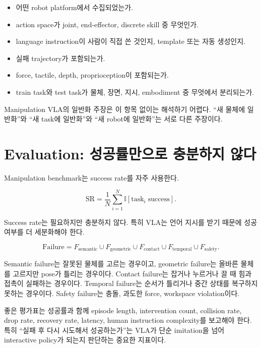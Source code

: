 \begin{itemize}
  \item 어떤 robot platform에서 수집되었는가.
  \item action space가 joint, end-effector, discrete skill 중 무엇인가.
  \item language instruction이 사람이 직접 쓴 것인지, template 또는 자동 생성인지.
  \item 실패 trajectory가 포함되는가.
  \item force, tactile, depth, proprioception이 포함되는가.
  \item train task와 test task가 물체, 장면, 지시, embodiment 중 무엇에서 분리되는가.
\end{itemize}

Manipulation VLA의 일반화 주장은 이 항목 없이는 해석하기 어렵다. ``새 물체에 일반화''와 ``새 task에 일반화''와 ``새 robot에 일반화''는 서로 다른 주장이다.

\section{Evaluation: 성공률만으로 충분하지 않다}

Manipulation benchmark는 success rate를 자주 사용한다.

\begin{equation}
  \mathrm{SR}
  =
  \frac{1}{N}
  \sum_{i=1}^{N}
  \mathbb{I}
  \left[
    \mathrm{task}_i \; \mathrm{success}
  \right].
\end{equation}

Success rate는 필요하지만 충분하지 않다. 특히 VLA는 언어 지시를 받기 때문에 성공 여부를 더 세분화해야 한다.

\begin{equation}
  \mathrm{Failure}
  =
  F_{\mathrm{semantic}}
  \cup
  F_{\mathrm{geometric}}
  \cup
  F_{\mathrm{contact}}
  \cup
  F_{\mathrm{temporal}}
  \cup
  F_{\mathrm{safety}}.
\end{equation}

Semantic failure는 잘못된 물체를 고르는 경우이고, geometric failure는 올바른 물체를 고르지만 pose가 틀리는 경우이다. Contact failure는 잡거나 누르거나 끌 때 힘과 접촉이 실패하는 경우이다. Temporal failure는 순서가 틀리거나 중간 상태를 복구하지 못하는 경우이다. Safety failure는 충돌, 과도한 force, workspace violation이다.

좋은 평가표는 성공률과 함께 episode length, intervention count, collision rate, drop rate, recovery rate, latency, human instruction complexity를 보고해야 한다. 특히 ``실패 후 다시 시도해서 성공하는가''는 VLA가 단순 imitation을 넘어 interactive policy가 되는지 판단하는 중요한 지표이다.

